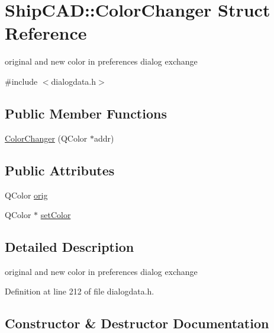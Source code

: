 \hypertarget{structShipCAD_1_1ColorChanger}{}\section{Ship\+C\+AD\+:\+:Color\+Changer Struct Reference}
\label{structShipCAD_1_1ColorChanger}


original and new color in preferences dialog exchange  




{\ttfamily \#include $<$dialogdata.\+h$>$}

\subsection*{Public Member Functions}
\begin{DoxyCompactItemize}
\item 
\hyperlink{structShipCAD_1_1ColorChanger_a21709f0ab068edb101c03122cc3a187c}{Color\+Changer} (Q\+Color $\ast$addr)
\end{DoxyCompactItemize}
\subsection*{Public Attributes}
\begin{DoxyCompactItemize}
\item 
Q\+Color \hyperlink{structShipCAD_1_1ColorChanger_ab9a1ad436c2f88dc98ca0df0c6954629}{orig}
\item 
Q\+Color $\ast$ \hyperlink{structShipCAD_1_1ColorChanger_a02791ae9fddb3e9a97ff84ae65b8e76e}{set\+Color}
\end{DoxyCompactItemize}


\subsection{Detailed Description}
original and new color in preferences dialog exchange 

Definition at line 212 of file dialogdata.\+h.



\subsection{Constructor \& Destructor Documentation}
